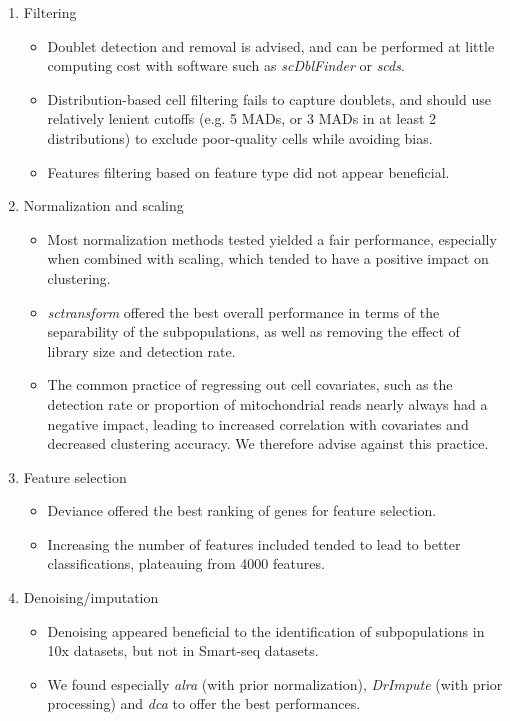 \documentclass{bmcart}
\begin{document}
\begin{enumerate}
   \item Filtering
   \begin{itemize}
     \item Doublet detection and removal is advised, and can be performed at little computing cost with software such as \textit{scDblFinder} or \textit{scds}.
     \item Distribution-based cell filtering fails to capture doublets, and should use relatively lenient cutoffs (e.g. 5 MADs, or 3 MADs in at least 2 distributions) to exclude poor-quality cells while avoiding bias.
     \item Features filtering based on feature type did not appear beneficial.
   \end{itemize}
   \item Normalization and scaling
   \begin{itemize}
     \item Most normalization methods tested yielded a fair performance, especially when combined with scaling, which tended to have a positive impact on clustering.
     \item \textit{sctransform} offered the best overall performance in terms of the separability of the subpopulations, as well as removing the effect of library size and detection rate.
     \item The common practice of regressing out cell covariates, such as the detection rate or proportion of mitochondrial reads nearly always had a negative impact, leading to increased correlation with covariates and decreased clustering accuracy. We therefore advise against this practice.
   \end{itemize}
   \item Feature selection
   \begin{itemize}
     \item Deviance \citep{townesGlmpca2019} offered the best ranking of genes for feature selection.
     \item Increasing the number of features included tended to lead to better classifications, plateauing from 4000 features.
   \end{itemize}
   \item Denoising/imputation
   \begin{itemize}
       \item Denoising appeared beneficial to the identification of subpopulations in 10x datasets, but not in Smart-seq datasets.
       \item We found especially \textit{alra} (with prior normalization), \textit{DrImpute} (with prior processing) and \textit{dca} to offer the best performances.

\end{itemize}
\end{enumerate}
\end{document}
